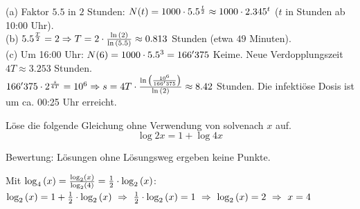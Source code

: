\documentclass[11pt]{exam}
\begin{document}
\begin{questions}
{\begin{solution}
		(a) Faktor $5.5$ in $2$ Stunden: $N(t)=1000\cdot5.5^{\frac{t}{2}}\approx1000\cdot2.345^t$ ($t$ in Stunden ab 10:00 Uhr).\\
		(b) $5.5^{\frac{T}{2}}=2\Rightarrow T=2\*\frac{\ln{2}}{\ln{5.5}}\approx0.813$ Stunden (etwa $49$ Minuten).\\
		(c) Um 16:00 Uhr: $N(6)=1000\cdot5.5^3=166'375$ Keime. Neue Verdopplungszeit $4T\approx3.253$ Stunden.\\
		$166'375\*2^{\frac{s}{4T}}=10^6\Rightarrow s=4T\*\frac{\ln{\frac{10^6}{166'375}}}{\ln{2}}\approx8.42$ Stunden. Die infektiöse Dosis ist um ca. 00:25 Uhr erreicht.
\end{solution}}
{}

\question[4]
Löse die folgende Gleichung ohne Verwendung von \flqq solve\frqq\:nach $x$ auf. \[\log{2}{x}=1+\log{4}{x}\]
\begin{small}
    Bewertung: Lösungen ohne Lösungsweg ergeben keine Punkte.
\end{small}
{\begin{solution}
		Mit $\log{4}{x}=\frac{\log{2}{x}}{\log{2}{4}}=\frac{1}{2}\*\log{2}{x}$: $\log{2}{x}=1+\frac{1}{2}\*\log{2}{x}\ \Rightarrow\ \frac{1}{2}\*\log{2}{x}=1\ \Rightarrow\ \log{2}{x}=2\ \Rightarrow\ x=4$
\end{solution}}
{}


\end{questions}
\end{document}
